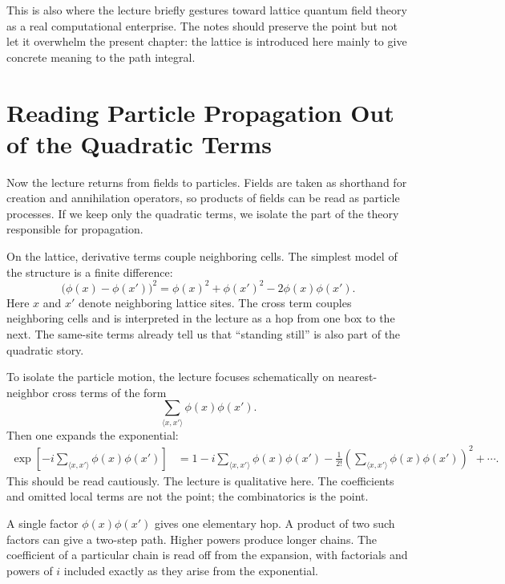 This is also where the lecture briefly gestures toward lattice quantum field theory as a real computational enterprise. The notes should preserve the point but not let it overwhelm the present chapter: the lattice is introduced here mainly to give concrete meaning to the path integral.

\section{Reading Particle Propagation Out of the Quadratic Terms}

Now the lecture returns from fields to particles. Fields are taken as shorthand for creation and annihilation operators, so products of fields can be read as particle processes. If we keep only the quadratic terms, we isolate the part of the theory responsible for propagation.

On the lattice, derivative terms couple neighboring cells. The simplest model of the structure is a finite difference:
\begin{equation}
\bigl(\phi(x)-\phi(x')\bigr)^2
=
\phi(x)^2+\phi(x')^2-2\phi(x)\phi(x').
\end{equation}
Here \(x\) and \(x'\) denote neighboring lattice sites. The cross term couples neighboring cells and is interpreted in the lecture as a hop from one box to the next. The same-site terms already tell us that ``standing still'' is also part of the quadratic story.

To isolate the particle motion, the lecture focuses schematically on nearest-neighbor cross terms of the form
\begin{equation}
\sum_{\langle x,x'\rangle}\phi(x)\phi(x').
\end{equation}
Then one expands the exponential:
\begin{align}
\exp\!\left[-i\sum_{\langle x,x'\rangle}\phi(x)\phi(x')\right]
&=
1
-i\sum_{\langle x,x'\rangle}\phi(x)\phi(x')
-\frac{1}{2!}\left(\sum_{\langle x,x'\rangle}\phi(x)\phi(x')\right)^2
+\cdots .
\end{align}
This should be read cautiously. The lecture is qualitative here. The coefficients and omitted local terms are not the point; the combinatorics is the point.

A single factor \(\phi(x)\phi(x')\) gives one elementary hop. A product of two such factors can give a two-step path. Higher powers produce longer chains. The coefficient of a particular chain is read off from the expansion, with factorials and powers of \(i\) included exactly as they arise from the exponential.

